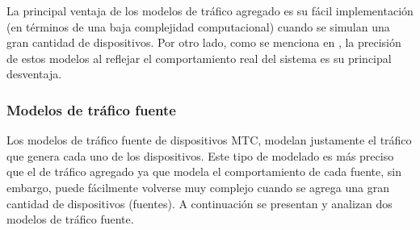 La principal ventaja de los modelos de tráfico agregado es su fácil implementación (en términos de una baja complejidad computacional) cuando se simulan una gran cantidad de dispositivos. Por otro lado, como se menciona en \parencite{IoTTrafficHossfeld}, la precisión de estos modelos al reflejar el comportamiento real del sistema es su principal desventaja.

\subsubsection{Modelos de tráfico fuente}

Los modelos de tráfico fuente de dispositivos MTC, modelan justamente el tráfico que genera cada uno de los dispositivos. Este tipo de modelado es más preciso que el de tráfico agregado ya que modela el comportamiento de cada fuente, sin embargo, puede fácilmente volverse muy complejo cuando se agrega una gran cantidad de dispositivos (fuentes). A continuación se presentan y analizan dos modelos de tráfico fuente.

